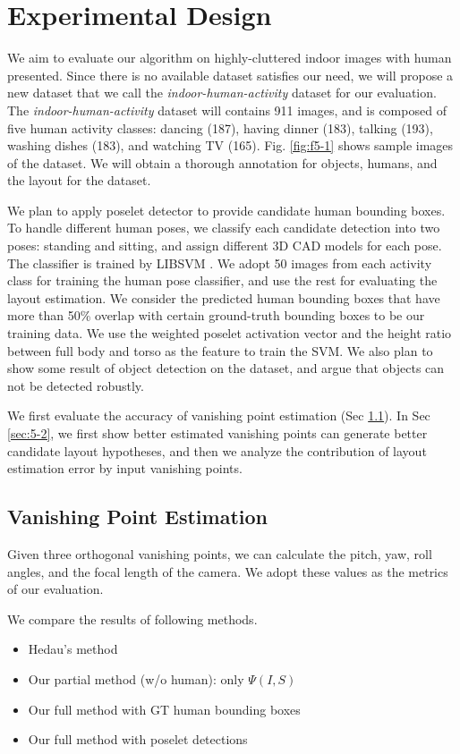 \section{Experimental Design}
\label{sec:5}

We aim to evaluate our algorithm on highly-cluttered indoor images with human presented. Since there is no available dataset satisfies our need, we will propose a new dataset that we call the \textit{indoor-human-activity} dataset for our evaluation. The \textit{indoor-human-activity} dataset will contains 911 images, and is composed of five human activity classes: dancing (187), having dinner (183), talking (193), washing dishes (183), and watching TV (165). Fig. \ref{fig:f5-1} shows sample images of the dataset. We will obtain a thorough annotation for objects, humans, and the layout for the dataset.

We plan to apply poselet detector \cite{Bourdev_ICCV2009,Bourdev_ECCV2010} to provide candidate human bounding boxes. To handle different human poses, we classify each candidate detection into two poses: standing and sitting, and assign different 3D CAD models for each pose. The classifier is trained by LIBSVM \cite{CC01a}. We adopt 50 images from each activity class for training the human pose classifier, and use the rest for evaluating the layout estimation. We consider the predicted human bounding boxes that have more than 50\% overlap with certain ground-truth bounding boxes to be our training data. We use the weighted poselet activation vector and the height ratio between full body and torso as the feature to train the SVM. We also plan to show some result of object detection on the dataset, and argue that objects can not be detected robustly.

We first evaluate the accuracy of vanishing point estimation (Sec \ref{sec:5-1}). In Sec \ref{sec:5-2}, we first show better estimated vanishing points can generate better candidate layout hypotheses, and then we analyze the contribution of layout estimation error by input vanishing points.


\subsection{Vanishing Point Estimation}
\label{sec:5-1}
Given three orthogonal vanishing points, we can calculate the pitch, yaw, roll angles, and the focal length of the camera. We adopt these values as the metrics of our evaluation. 

We compare the results of following methods.
\begin{itemize}
  \item Hedau's method \cite{Hedau_ICCV2009}
  \item Our partial method (w/o human): only $\Psi(I,S)$
  \item Our full method with GT human bounding boxes
  \item Our full method with poselet detections
\end{itemize}

